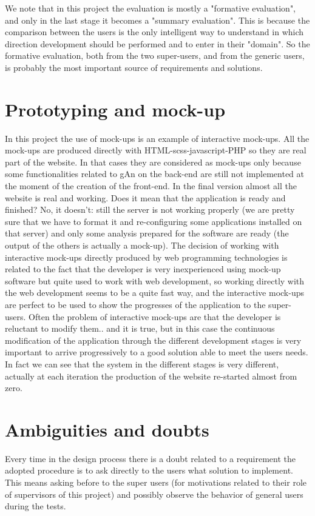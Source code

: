 We note that in this project the evaluation is mostly a "formative evaluation", and only in the last stage it becomes a "summary evaluation". This is because the comparison between the users is the only intelligent way to understand in which direction development should be performed and to enter in their "domain". So the formative evaluation, both from the two super-users, and from the generic users, is probably the most important source of requirements and solutions.   

\section{Prototyping and mock-up}
In this project the use of mock-ups is an example of interactive mock-ups. All the mock-ups are produced directly with HTML-scss-javascript-PHP so they are real part of the website. In that cases they are considered as mock-ups only because some functionalities related to gAn on the back-end are still not implemented at the moment of the creation of the front-end. In the final version almost all the website is real and working. Does it mean that the application is ready and finished? No, it doesn't: still the server is not working properly (we are pretty sure that we have to format it and re-configuring some applications installed on that server) and only some analysis prepared for the software are ready (the output of the others is actually a mock-up). The decision of working with interactive mock-ups directly produced by web programming technologies is related to the fact that the developer is very inexperienced using mock-up software but quite used to work with web development, so working directly with the web development seems to be a quite fast way, and the interactive mock-ups are perfect to be used to show the progresses of the application to the super-users.
Often the problem of interactive mock-ups are that the developer is reluctant to modify them.. and it is true, but in this case the continuous modification of the application through the different development stages is very important to arrive progressively to a good solution able to meet the users needs. In fact we can see that the system in the different stages is very different, actually at each iteration the production of the website re-started almost from zero. 

\section{Ambiguities and doubts}
Every time in the design process there is a doubt related to a requirement the adopted procedure is to ask directly to the users what solution to implement. This means asking before to the super users (for motivations related to their role of supervisors of this project) and possibly observe the behavior of general 
users during the tests.

